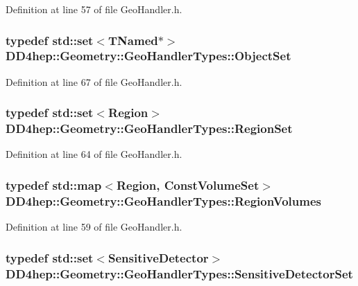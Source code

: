 Definition at line 57 of file GeoHandler.h.\hypertarget{class_d_d4hep_1_1_geometry_1_1_geo_handler_types_a1e77c8aec4a291253804630c590af1d8}{
\subsubsection[{ObjectSet}]{\setlength{\rightskip}{0pt plus 5cm}typedef std::set$<${\bf TNamed}$\ast$$>$ {\bf DD4hep::Geometry::GeoHandlerTypes::ObjectSet}}}
\label{class_d_d4hep_1_1_geometry_1_1_geo_handler_types_a1e77c8aec4a291253804630c590af1d8}


Definition at line 67 of file GeoHandler.h.\hypertarget{class_d_d4hep_1_1_geometry_1_1_geo_handler_types_a871413f297c033590fb56dcba5cc7dac}{
\subsubsection[{RegionSet}]{\setlength{\rightskip}{0pt plus 5cm}typedef std::set$<${\bf Region}$>$ {\bf DD4hep::Geometry::GeoHandlerTypes::RegionSet}}}
\label{class_d_d4hep_1_1_geometry_1_1_geo_handler_types_a871413f297c033590fb56dcba5cc7dac}


Definition at line 64 of file GeoHandler.h.\hypertarget{class_d_d4hep_1_1_geometry_1_1_geo_handler_types_a8e121c3a06f16781bbabba4528136654}{
\subsubsection[{RegionVolumes}]{\setlength{\rightskip}{0pt plus 5cm}typedef std::map$<${\bf Region}, {\bf ConstVolumeSet}$>$ {\bf DD4hep::Geometry::GeoHandlerTypes::RegionVolumes}}}
\label{class_d_d4hep_1_1_geometry_1_1_geo_handler_types_a8e121c3a06f16781bbabba4528136654}


Definition at line 59 of file GeoHandler.h.\hypertarget{class_d_d4hep_1_1_geometry_1_1_geo_handler_types_a16da960fef01a5643d04a029e524374f}{
\subsubsection[{SensitiveDetectorSet}]{\setlength{\rightskip}{0pt plus 5cm}typedef std::set$<${\bf SensitiveDetector}$>$ {\bf DD4hep::Geometry::GeoHandlerTypes::SensitiveDetectorSet}}}
\label{class_d_d4hep_1_1_geometry_1_1_geo_handler_types_a16da960fef01a5643d04a029e524374f}


